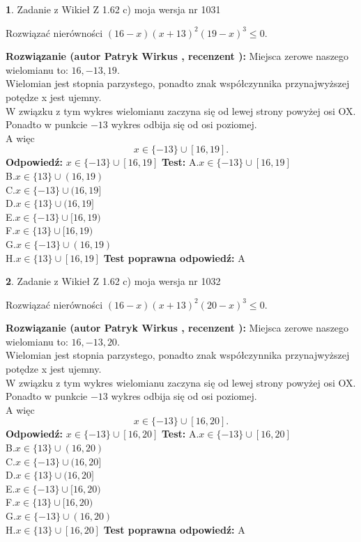 \documentclass[12pt, a4paper]{article}
\theoremstyle{definition} %
\newtheorem{zad}{}
\newcommand{\zadStart}[1]{\begin{zad}#1\newline}
\newcommand{\zadStop}{\end{zad}}
\newcommand{\rozwStart}[2]{\noindent \textbf{Rozwiązanie (autor #1 , recenzent #2): }\newline}
\newcommand{\rozwStop}{\newline}
\newcommand{\odpStart}{\noindent \textbf{Odpowiedź:}\newline}
\newcommand{\odpStop}{\newline}
\newcommand{\testStart}{\noindent \textbf{Test:}\newline}
\newcommand{\testStop}{\newline}
\newcommand{\kluczStart}{\noindent \textbf{Test poprawna odpowiedź:}\newline}
\newcommand{\kluczStop}{\newline}
\begin{document}
\zadStart{Zadanie z Wikieł Z 1.62 c) moja wersja nr 1031}

Rozwiązać nierówności $(16-x)(x+13)^{2}(19-x)^{3}\le0$.
\zadStop
\rozwStart{Patryk Wirkus}{}
Miejsca zerowe naszego wielomianu to: $16, -13, 19$.\\
Wielomian jest stopnia parzystego, ponadto znak współczynnika przy\linebreak najwyższej potędze x jest ujemny.\\ W związku z tym wykres wielomianu zaczyna się od lewej strony powyżej osi OX.\\
Ponadto w punkcie $-13$ wykres odbija się od osi poziomej.\\
A więc $$x \in \{-13\} \cup [16,19].$$
\rozwStop
\odpStart
$x \in \{-13\} \cup [16,19]$
\odpStop
\testStart
A.$x \in \{-13\} \cup [16,19]$\\
B.$x \in \{13\} \cup (16,19)$\\
C.$x \in \{-13\} \cup (16,19]$\\
D.$x \in \{13\} \cup (16,19]$\\
E.$x \in \{-13\} \cup [16,19)$\\
F.$x \in \{13\} \cup [16,19)$\\
G.$x \in \{-13\} \cup (16,19)$\\
H.$x \in \{13\} \cup [16,19]$
\testStop
\kluczStart
A
\kluczStop



\zadStart{Zadanie z Wikieł Z 1.62 c) moja wersja nr 1032}

Rozwiązać nierówności $(16-x)(x+13)^{2}(20-x)^{3}\le0$.
\zadStop
\rozwStart{Patryk Wirkus}{}
Miejsca zerowe naszego wielomianu to: $16, -13, 20$.\\
Wielomian jest stopnia parzystego, ponadto znak współczynnika przy\linebreak najwyższej potędze x jest ujemny.\\ W związku z tym wykres wielomianu zaczyna się od lewej strony powyżej osi OX.\\
Ponadto w punkcie $-13$ wykres odbija się od osi poziomej.\\
A więc $$x \in \{-13\} \cup [16,20].$$
\rozwStop
\odpStart
$x \in \{-13\} \cup [16,20]$
\odpStop
\testStart
A.$x \in \{-13\} \cup [16,20]$\\
B.$x \in \{13\} \cup (16,20)$\\
C.$x \in \{-13\} \cup (16,20]$\\
D.$x \in \{13\} \cup (16,20]$\\
E.$x \in \{-13\} \cup [16,20)$\\
F.$x \in \{13\} \cup [16,20)$\\
G.$x \in \{-13\} \cup (16,20)$\\
H.$x \in \{13\} \cup [16,20]$
\testStop
\kluczStart
A
\kluczStop
\end{document}
